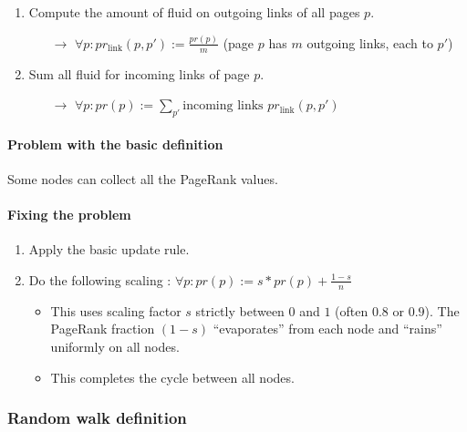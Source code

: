 \begin{enumerate}
\item Compute the amount of fluid on outgoing links of all pages $p$.
	\begin{itemize}
	\item[$\rightarrow$] $\forall p : pr_{\text{link}}(p, p') := \frac{pr(p)}{m}$ (page $p$ has $m$ outgoing links, each to $p'$)
	\end{itemize}
\item Sum all fluid for incoming links of page $p$.
	\begin{itemize}
	\item[$\rightarrow$] $\forall p : pr(p) := \sum_{p'} \text{incoming links } pr_{\text{link}}(p, p')$
	\end{itemize}
\end{enumerate}

\paragraph{Problem with the basic definition}

Some nodes can collect all the PageRank values.

\paragraph{Fixing the problem}

\begin{enumerate}
\item Apply the basic update rule.
\item Do the following scaling : $\forall p : pr(p) := s * pr(p) + \frac{1 - s}{n}$
	\begin{itemize}
	\item This uses scaling factor $s$ strictly between $0$ and $1$ (often $0.8$ or $0.9$). The PageRank fraction $(1-s)$ “evaporates” from each node and “rains” uniformly on all nodes.
	\item This completes the cycle between all nodes.
	\end{itemize}
\end{enumerate}

\subsubsection{Random walk definition}

